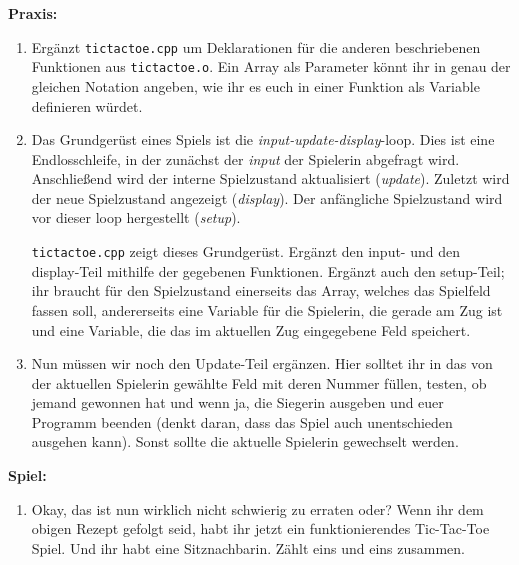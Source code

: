 \textbf{Praxis:}
\begin{enumerate}
    \item Ergänzt \texttt{tictactoe.cpp} um Deklarationen für die anderen
        beschriebenen Funktionen aus \texttt{tictactoe.o}. Ein Array als
        Parameter könnt ihr in genau der gleichen Notation angeben, wie ihr es
        euch in einer Funktion als Variable definieren würdet.
    \item Das Grundgerüst eines Spiels ist die \emph{input-update-display}-loop.
        Dies ist eine Endlosschleife, in der zunächst der \emph{input} der
        Spielerin abgefragt wird. Anschließend wird der interne Spielzustand
        aktualisiert (\emph{update}). Zuletzt wird der neue Spielzustand
        angezeigt (\emph{display}). Der anfängliche Spielzustand wird vor
        dieser loop hergestellt (\emph{setup}).

        \texttt{tictactoe.cpp} zeigt dieses Grundgerüst. Ergänzt den input- und
        den display-Teil mithilfe der gegebenen Funktionen. Ergänzt auch den
        setup-Teil; ihr braucht für den Spielzustand einerseits das Array,
        welches das Spielfeld fassen soll, andererseits eine Variable für die
        Spielerin, die gerade am Zug ist und eine Variable, die das im
        aktuellen Zug eingegebene Feld speichert.
    \item Nun müssen wir noch den Update-Teil ergänzen. Hier solltet ihr in das
        von der aktuellen Spielerin gewählte Feld mit deren Nummer füllen,
        testen, ob jemand gewonnen hat und wenn ja, die Siegerin ausgeben und
        euer Programm beenden (denkt daran, dass das Spiel auch unentschieden
        ausgehen kann). Sonst sollte die aktuelle Spielerin gewechselt werden.
\end{enumerate}

\textbf{Spiel:}
\begin{enumerate}
    \item Okay, das ist nun wirklich nicht schwierig zu erraten oder? Wenn ihr
        dem obigen Rezept gefolgt seid, habt ihr jetzt ein funktionierendes
        Tic-Tac-Toe Spiel. Und ihr habt eine Sitznachbarin. Zählt eins und eins
        zusammen.
\end{enumerate}
